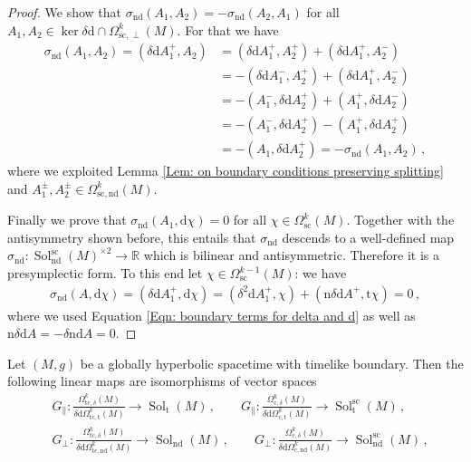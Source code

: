\begin{proof}
	We show that $\sigma_{\mathrm{nd}}(A_1,A_2)=-\sigma_{\mathrm{nd}}(A_2,A_1)$ for all $A_1,A_2\in\ker\delta\mathrm{d}\cap\Omega_{\mathrm{sc},\perp}^k(M)$.
	For that we have
	\begin{align*}
	\sigma_{\mathrm{nd}}(A_1,A_2)=
	(\delta\mathrm{d}A_1^+,A_2)&=
	(\delta\mathrm{d}A_1^+,A_2^+)+(\delta\mathrm{d}A_1^+,A_2^-)\\&=
	-(\delta\mathrm{d}A_1^-,A_2^+)+(\delta\mathrm{d}A_1^+,A_2^-)\\&=
	-(A_1^-,\delta\mathrm{d}A_2^+)+(A_1^+,\delta\mathrm{d}A_2^-)\\&=
	-(A_1^-,\delta\mathrm{d}A_2^+)-(A_1^+,\delta\mathrm{d}A_2^+)\\&=
	-(A_1,\delta\mathrm{d}A_2^+)=
	-\sigma_{\mathrm{nd}}(A_1,A_2)\,,
	\end{align*}
	where we exploited Lemma \ref{Lem: on boundary conditions preserving splitting} and $A_1^\pm,A_2^\pm\in\Omega_{\mathrm{sc,nd}}^k(M)$.
	
	Finally we prove that $\sigma_{\mathrm{nd}}(A_1,\mathrm{d}\chi)=0$ for all $\chi\in\Omega^k_{\mathrm{sc}}(M)$.
	Together with the antisymmetry shown before, this entails that $\sigma_{\mathrm{nd}}$ descends to a well-defined map $\sigma_{\mathrm{nd}}\colon\operatorname{Sol}_{\mathrm{nd}}^{\mathrm{sc}}(M)^{\times 2}\to\mathbb{R}$ which is bilinear and antisymmetric. Therefore it is a presymplectic form.
	To this end let $\chi\in\Omega^{k-1}_{\mathrm{sc}}(M)$: we have
	\begin{align*}
	\sigma_{\mathrm{nd}}(A,\mathrm{d}\chi)=
	(\delta\mathrm{d}A_1^+,\mathrm{d}\chi)=
	(\delta^2\mathrm{d}A_1^+,\chi)
	+(\mathrm{n}\delta\mathrm{d}A^+,\mathrm{t}\chi)=0\,,
	\end{align*}
	where we used Equation \eqref{Eqn: boundary terms for delta and d} as well as $\mathrm{n}\delta\mathrm{d}A=-\delta\mathrm{nd}A=0$.
\end{proof}

\begin{propositio}\label{Prop: proof characterization of solution space in terms of test-forms}
	Let $(M,g)$ be a globally hyperbolic spacetime with timelike boundary.
	Then the following linear maps are isomorphisms of vector spaces
	\begin{align}
	&G_\parallel\colon
	\frac{\Omega_{\mathrm{tc},\delta}^k(M)}{\delta\mathrm{d}\Omega_{\mathrm{tc},\mathrm{t}}^k(M)}\to
	\operatorname{Sol}_{\mathrm{t}}(M)\,,\qquad
	G_\parallel\colon
	\frac{\Omega_{\mathrm{c},\delta}^k(M)}{\delta\mathrm{d}\Omega_{\mathrm{c},\mathrm{t}}^k(M)}\to
	\operatorname{Sol}_{\mathrm{t}}^\mathrm{sc}{}(M)\,,\\
	&G_\perp\colon
	\frac{\Omega_{\mathrm{tc},\delta}^k(M)}{\delta\mathrm{d}\Omega_{\mathrm{tc},\mathrm{nd}}^k(M)}\to
	\operatorname{Sol}_{\mathrm{nd}}(M)\,,\qquad
	G_\perp\colon
	\frac{\Omega_{\mathrm{c},\delta}^k(M)}{\delta\mathrm{d}\Omega_{\mathrm{c},\mathrm{nd}}^k(M)}\to
	\operatorname{Sol}_{\mathrm{nd}}^\mathrm{sc}{}(M)\,,
	\end{align}
\end{propositio} 

